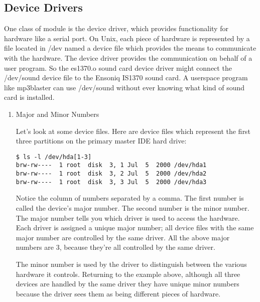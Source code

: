 \documentclass[10pt, oneside]{book}
\begin{document}
\subsection{Device Drivers}
\label{sec:org578c01b}
One class of module is the device driver, which provides functionality for hardware like a serial port. On Unix, each piece of hardware is represented by a file located in /dev named a device file which provides the means to communicate with the hardware. The device driver provides the communication on behalf of a user program. So the es1370.o sound card device driver might connect the /dev/sound device file to the Ensoniq IS1370 sound card. A userspace program like mp3blaster can use /dev/sound without ever knowing what kind of sound card is installed.

\begin{enumerate}
\item Major and Minor Numbers
\label{sec:org63bb013}

Let's look at some device files. Here are device files which represent the first three partitions on the primary master IDE hard drive:

\begin{verbatim}
$ ls -l /dev/hda[1-3]
brw-rw----  1 root  disk  3, 1 Jul  5  2000 /dev/hda1
brw-rw----  1 root  disk  3, 2 Jul  5  2000 /dev/hda2
brw-rw----  1 root  disk  3, 3 Jul  5  2000 /dev/hda3
\end{verbatim}

Notice the column of numbers separated by a comma. The first number is called the device's major number. The second number is the minor number. The major number tells you which driver is used to access the hardware. Each driver is assigned a unique major number; all device files with the same major number are controlled by the same driver. All the above major numbers are 3, because they're all controlled by the same driver.

The minor number is used by the driver to distinguish between the various hardware it controls. Returning to the example above, although all three devices are handled by the same driver they have unique minor numbers because the driver sees them as being different pieces of hardware.


\end{enumerate}
\end{document}
